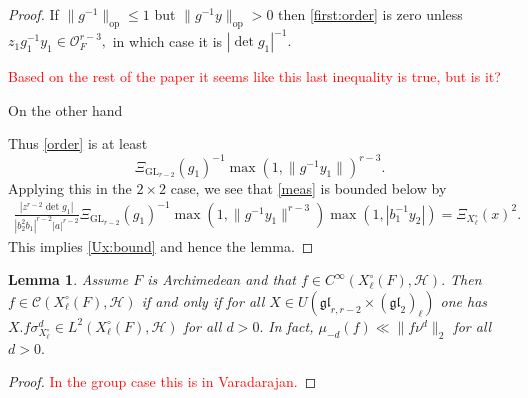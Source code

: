 \documentclass[12pt]{amsart}
\newtheorem{lem}[thm]{Lemma}
\theoremstyle{remark}
\numberwithin{equation}{section}
\newcommand{\GL}{\mathrm{GL}}
\newcommand{\OO}{\mathcal{O}}
\theoremstyle{definition}
\numberwithin{equation}{subsection}
\newcommand{\norm}[1]{\lVert#1\rVert}
\begin{document}
{\begin{proof}
If $\norm{g^{-1}}_{\mathrm{op}} \leq 1$ but $\norm{g^{-1}y}_{\mathrm{op}}>0$ then \eqref{first:order} is zero unless $z_1 g_1^{-1}y_1 \in \OO_F^{r-3},$ in which case it is $|\det g_1|^{-1}.$ 


\textcolor{red}{Based on the rest of the paper it seems like this last inequality is true, but is it?}


On the other hand 

Thus \eqref{order} is at least 
$$
\Xi_{\GL_{r-2}}(g_1)^{-1} \max(1,\norm{g^{-1}y_1})^{r-3}.
$$
Applying this in the $2 \times 2$ case, we see that \eqref{meas} is bounded below by 
\begin{align}
\frac{|z^{r-2}\det g_1|}{|b_2^2b_1|^{r-2}|a|^{r-2}} \Xi_{\GL_{r-2}}(g_1)^{-1}\max(1,\norm{g^{-1}y_1}^{r-3})\max(1,|b_1^{-1}y_2|)=\Xi_{X_\ell^\circ}(x)^2.
\end{align}
This implies \eqref{Ux:bound} and hence the lemma.
\end{proof}

\begin{lem} \label{lem:equiv:A}
Assume $F$ is Archimedean and that $f \in C^\infty(X_\ell^\circ(F),\mathcal{H}).$  Then  $f \in \mathcal{C}(X_\ell^\circ(F),\mathcal{H})$ if and only if for all $X \in U(\mathfrak{gl}_{r,r-2} \times (\mathfrak{gl}_2)_{\ell})$ one has $X.f \sigma_{X_\ell^\circ}^d \in L^2(X_\ell^{\circ}(F),\mathcal{H})$ for all $d>0.$  In fact, $\mu_{-d}(f) \ll \norm{f\nu^d}_2$ for all $d>0.$
\end{lem}
\begin{proof} 
\cite[II.9.4]{Varadarajan}
    \textcolor{red}{In the group case this is in Varadarajan.}
\end{proof}}
\end{document}
